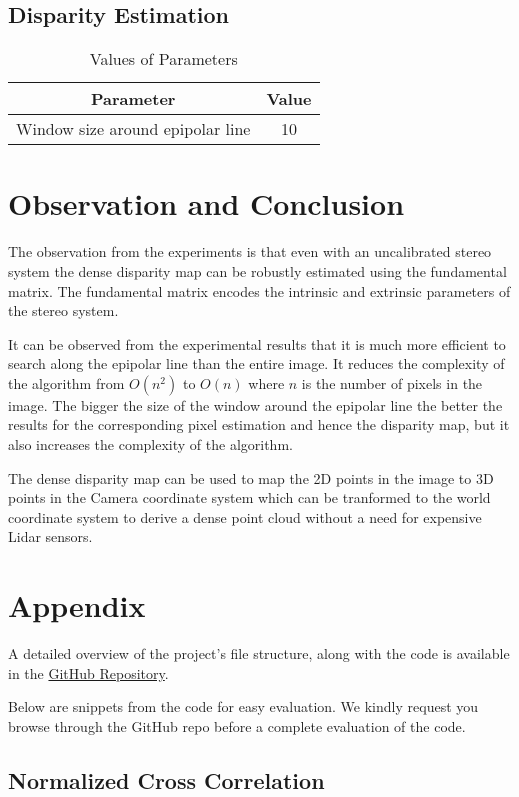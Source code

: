 \documentclass[conference]{IEEEtran}
\begin{document}
\subsection{Disparity Estimation}\label{AA}
\begin{table}[H]
\centering
\begin{tabular}{|c|c|}
\hline
Parameter & Value \\
\hline
\hline
Window size around epipolar line & 10 \\
\hline
\end{tabular}
\vspace{0.1cm}
\caption{Values of Parameters}
\label{tab:parameters}
\end{table}

\section{Observation and Conclusion}
The observation from the experiments is that even with an uncalibrated stereo system the dense disparity map can be robustly estimated using the fundamental matrix. The fundamental matrix encodes the intrinsic and extrinsic parameters of the stereo system.

It can be observed from the experimental results that it is much more efficient to search along the epipolar line than the entire image. It reduces the complexity of the algorithm from $O(n^2)$ to $O(n)$ where $n$ is the number of pixels in the image. The bigger the size of the window around the epipolar line the better the results for the corresponding pixel estimation and hence the disparity map, but it also increases the complexity of the algorithm.

The dense disparity map can be used to map the 2D points in the image to 3D points in the Camera coordinate system which can be tranformed to the world coordinate system to derive a dense point cloud without a need for expensive Lidar sensors.

\section{Appendix}
A detailed overview of the project's file structure, along with the code is available in the \href{https://github.com/sriram-0311/ImageMosaicing}{GitHub Repository}.

Below are snippets from the code for easy evaluation. We kindly request you browse through the GitHub repo before a complete evaluation of the code.

\subsection{\textbf{Normalized Cross Correlation}}\label{AA}
\end{document}
